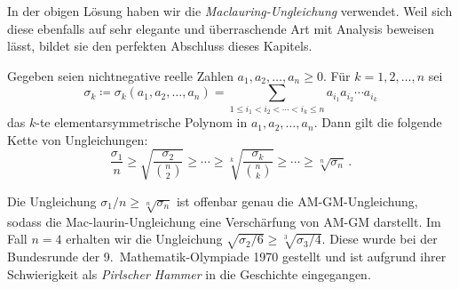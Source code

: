 In der obigen Lösung haben wir die \emph{Maclauring-Ungleichung} verwendet. Weil sich diese ebenfalls auf sehr elegante und überraschende Art mit Analysis beweisen lässt, bildet sie den perfekten Abschluss dieses Kapitels.
\begin{satzmitnamen}
	Gegeben seien nichtnegative reelle Zahlen $a_1,a_2,\dotsc,a_n\geqslant 0$. Für $k=1,2,\dotsc,n$ sei
	\begin{equation*}
		\sigma_k\coloneqq \sigma_k(a_1,a_2,\dotsc,a_n)= \sum_{1\leqslant i_1<i_2<\dotsb<i_k\leqslant n}a_{i_1}a_{i_2}\dotsm a_{i_k}
	\end{equation*}
	das $k$-te elementarsymmetrische Polynom in $a_1,a_2,\dotsc,a_n$. Dann gilt die folgende Kette von Ungleichungen:
	\begin{equation*}
		\frac{\sigma_1}{n}\geqslant\sqrt{\frac{\sigma_2}{\binom{n}{2}}}\geqslant \dotsb\geqslant \sqrt[k]{\frac{\sigma_k}{\binom{n}{k}}}\geqslant \dotsb\geqslant\sqrt[n]{\sigma_n}\,.
	\end{equation*}
\end{satzmitnamen}
Die Ungleichung $\sigma_1/n\geqslant \sqrt[n]{\sigma_n}$ ist offenbar genau die AM-GM-Ungleichung, sodass die Mac-laurin-Ungleichung eine Verschärfung von AM-GM darstellt. Im Fall $n=4$ erhalten wir die Ungleichung $\sqrt{\sigma_2/6}\geqslant \sqrt[3]{\sigma_3/4}$. Diese wurde bei der Bundesrunde der 9.\ Mathematik-Olympiade 1970 gestellt und ist aufgrund ihrer Schwierigkeit als \emph{Pirlscher Hammer} in die Geschichte eingegangen.


